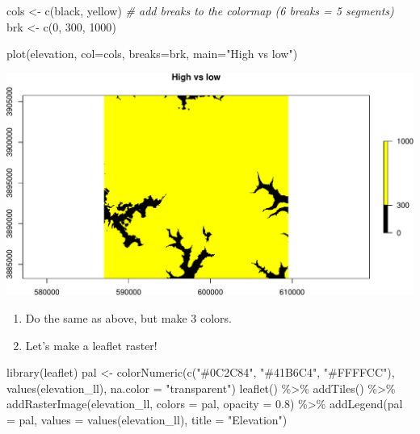 \documentclass[
]{book}
\newenvironment{Shaded}{\begin{snugshade}}{\end{snugshade}}
\newcommand{\AttributeTok}[1]{\textcolor[rgb]{0.77,0.63,0.00}{#1}}
\newcommand{\CommentTok}[1]{\textcolor[rgb]{0.56,0.35,0.01}{\textit{#1}}}
\newcommand{\DecValTok}[1]{\textcolor[rgb]{0.00,0.00,0.81}{#1}}
\newcommand{\FloatTok}[1]{\textcolor[rgb]{0.00,0.00,0.81}{#1}}
\newcommand{\FunctionTok}[1]{\textcolor[rgb]{0.00,0.00,0.00}{#1}}
\newcommand{\NormalTok}[1]{#1}
\newcommand{\OtherTok}[1]{\textcolor[rgb]{0.56,0.35,0.01}{#1}}
\newcommand{\SpecialCharTok}[1]{\textcolor[rgb]{0.00,0.00,0.00}{#1}}
\newcommand{\StringTok}[1]{\textcolor[rgb]{0.31,0.60,0.02}{#1}}
\begin{document}
\begin{Shaded}
\begin{Highlighting}[]
\NormalTok{cols }\OtherTok{\textless{}{-}} \FunctionTok{c}\NormalTok{(}\StringTok{\textquotesingle{}black\textquotesingle{}}\NormalTok{, }\StringTok{\textquotesingle{}yellow\textquotesingle{}}\NormalTok{)}
\CommentTok{\# add breaks to the colormap (6 breaks = 5 segments)}
\NormalTok{brk }\OtherTok{\textless{}{-}} \FunctionTok{c}\NormalTok{(}\DecValTok{0}\NormalTok{, }\DecValTok{300}\NormalTok{, }\DecValTok{1000}\NormalTok{)}

\FunctionTok{plot}\NormalTok{(elevation, }\AttributeTok{col=}\NormalTok{cols, }\AttributeTok{breaks=}\NormalTok{brk, }\AttributeTok{main=}\StringTok{"High vs low"}\NormalTok{)}
\end{Highlighting}
\end{Shaded}

\includegraphics{figures/unnamed-chunk-440-1.pdf}

\begin{enumerate}
\def\labelenumi{\arabic{enumi}.}
\setcounter{enumi}{33}
\item
  Do the same as above, but make 3 colors.
\item
  Let's make a leaflet raster!
\end{enumerate}

\begin{Shaded}
\begin{Highlighting}[]
\FunctionTok{library}\NormalTok{(leaflet)}
\NormalTok{pal }\OtherTok{\textless{}{-}} \FunctionTok{colorNumeric}\NormalTok{(}\FunctionTok{c}\NormalTok{(}\StringTok{"\#0C2C84"}\NormalTok{, }\StringTok{"\#41B6C4"}\NormalTok{, }\StringTok{"\#FFFFCC"}\NormalTok{), }\FunctionTok{values}\NormalTok{(elevation\_ll),}
  \AttributeTok{na.color =} \StringTok{"transparent"}\NormalTok{)}
\FunctionTok{leaflet}\NormalTok{() }\SpecialCharTok{\%\textgreater{}\%} 
  \FunctionTok{addTiles}\NormalTok{() }\SpecialCharTok{\%\textgreater{}\%}
  \FunctionTok{addRasterImage}\NormalTok{(elevation\_ll, }\AttributeTok{colors =}\NormalTok{ pal, }\AttributeTok{opacity =} \FloatTok{0.8}\NormalTok{) }\SpecialCharTok{\%\textgreater{}\%}
  \FunctionTok{addLegend}\NormalTok{(}\AttributeTok{pal =}\NormalTok{ pal, }\AttributeTok{values =} \FunctionTok{values}\NormalTok{(elevation\_ll),}
    \AttributeTok{title =} \StringTok{"Elevation"}\NormalTok{)}
\end{Highlighting}
\end{Shaded}
\end{document}
